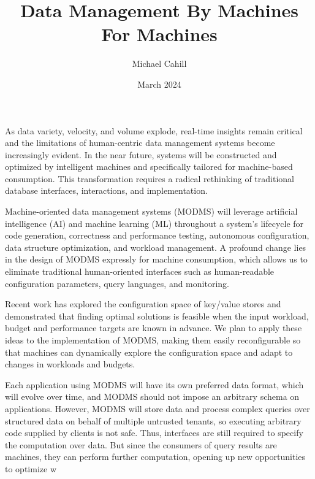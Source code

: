\documentclass[acmsmall, nonacm]{acmart}
\begin{document}
\title{Data Management By Machines For Machines}
\author{Michael Cahill}

\date{March 2024}
\maketitle

As data variety, velocity, and volume explode, real-time insights remain critical and the limitations of human-centric data management systems become increasingly evident. In the near future, systems will be constructed and optimized by intelligent machines and specifically tailored for machine-based consumption. This transformation requires a radical rethinking of traditional database interfaces, interactions, and implementation.

Machine-oriented data management systems (MODMS) will leverage artificial intelligence (AI) and machine learning (ML) throughout a system's lifecycle for code generation, correctness and performance testing, autonomous configuration, data structure optimization, and workload management. A profound change lies in the design of MODMS expressly for machine consumption, which allows us to eliminate traditional human-oriented interfaces such as human-readable configuration parameters, query languages, and monitoring.

Recent work has explored the configuration space of key/value stores and demonstrated that finding optimal solutions is feasible when the input workload, budget and performance targets are known in advance. We plan to apply these ideas to the implementation of MODMS, making them easily reconfigurable so that machines can dynamically explore the configuration space and adapt to changes in workloads and budgets. 

Each application using MODMS will have its own preferred data format, which will evolve over time, and MODMS should not impose an arbitrary schema on applications. However, MODMS will store data and process complex queries over structured data on behalf of multiple untrusted tenants, so executing arbitrary code supplied by clients is not safe. Thus, interfaces are still required to specify the computation over  data. But since the consumers of query results are machines, they can perform further computation, opening up new opportunities to optimize w
\end{document}
